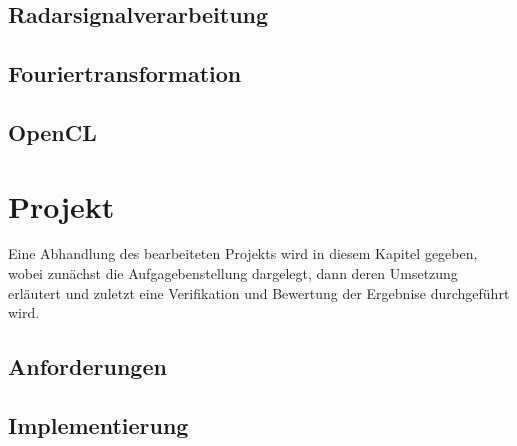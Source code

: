 \documentclass[a4paper,12pt,oneside,german,toc=bibliography]{scrbook}
\theoremstyle{definition}
\theoremstyle{plain}
\numberwithin{equation}{section}
\begin{document}





\section{Radarsignalverarbeitung}
    
    
    
    


\section{Fouriertransformation}
    
    
    




\section{OpenCL}




\chapter{Projekt}
Eine Abhandlung des bearbeiteten Projekts wird in diesem Kapitel gegeben,
wobei zunächst die Aufgagebenstellung dargelegt, dann deren Umsetzung erläutert
und zuletzt eine Verifikation und Bewertung der Ergebnise durchgeführt wird.


\section{Anforderungen}


\section{Implementierung}
\end{document}
